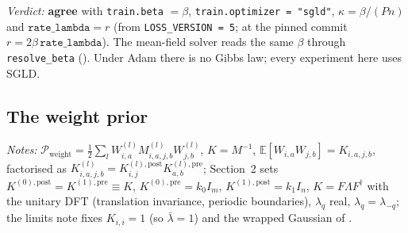 \documentclass[11pt,a4paper]{article}
\newcommand{\E}{\mathbb E}
\newcommand{\code}[1]{\texttt{#1}}
\newcommand{\agree}{\textbf{agree}}
\begin{document}
\emph{Verdict:} \agree{} with \code{train.beta} $=\beta$, \code{train.optimizer = "sgld"}, $\kappa = \beta/(Pn)$ and $\code{rate\_lambda} = r$ (from \code{LOSS\_VERSION = 5}; at the pinned commit $r = 2\beta\,\code{rate\_lambda}$). The mean-field solver reads the same $\beta$ through \code{resolve\_beta} (). Under Adam there is no Gibbs law; every experiment here uses SGLD.

\subsection{The weight prior}
\label{sec:prior}
\emph{Notes:} $\mathcal P_{\mathrm{weight}} = \frac12\sum_l W^{(l)}_{i,a}M^{(l)}_{i,a,j,b}W^{(l)}_{j,b}$, $K = M^{-1}$, $\E[W_{i,a}W_{j,b}] = K_{i,a,j,b}$, factorised as $K^{(l)}_{i,a,j,b} = K^{(l),\mathrm{post}}_{i,j}K^{(l),\mathrm{pre}}_{a,b}$; Section~2 sets $K^{(0),\mathrm{post}} = K^{(1),\mathrm{pre}}\equiv K$, $K^{(0),\mathrm{pre}} = k_0I_m$, $K^{(1),\mathrm{post}} = k_1I_n$, $K = F\Lambda F^\dagger$ with the unitary DFT (translation invariance, periodic boundaries), $\lambda_q$ real, $\lambda_q = \lambda_{-q}$; the limits note fixes $K_{i,i} = 1$ (so $\bar\lambda = 1$) and the wrapped Gaussian of .
\end{document}
